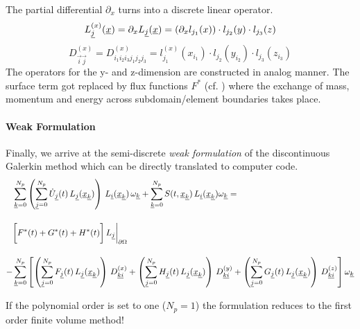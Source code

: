 The partial differential
$\partial_x$ turns into a discrete linear operator.
\newcommand{\DXKI}{D^{(x)}_{\vec{k}\vec{i}}}
\newcommand{\DYKI}{D^{(y)}_{\vec{k}\vec{i}}}
\newcommand{\DZKI}{D^{(z)}_{\vec{k}\vec{i}}}
\begin{equation}
    L^{(x)}_{\underline{j}}(\underline{x}) = \partial_x L_{\underline{j}}(\underline{x}) = (\partial_x l_{j_1}(x)) \cdot l_{j_2}(y) \cdot l_{j_3}(z)
\end{equation}
\begin{equation}
    D^{(x)}_{\vec{i}\vec{j}} = D^{(x)}_{i_1i_2i_3j_1j_2j_3} = l^{(x)}_{j_1}(x_{i_1})\cdot l_{j_2}(y_{i_2}) \cdot l_{j_3}(z_{i_3})
\end{equation}
The operators for the y- and z-dimension are constructed in analog manner.  The
surface term got replaced by flux functions $F^*$ (cf. )
where the exchange of mass, momentum and energy across subdomain/element
boundaries takes place.

\paragraph{Weak Formulation}
Finally, we arrive at the semi-discrete \emph{weak formulation} of the
discontinuous Galerkin method which can be directly translated to computer
code.
\begin{align}
\label{eqn:semi-discrete-weak-formulation}
     &\sumK \left(\sumJ \UJ \, \LJK \right) \, \LIK \,\wK + \sumK \STXK \, \LIK \wK = \nonumber \br
     &\bigg[ F^*(t) + G^*(t) + H^*(t)\bigg]\, L_{\vec{j}}\bigg|_{\partial\Omega} \br
    -&\sumK \left[
          \left(\sumJ \FJ \, \LJK \right) \, \DXKI 
        + \left(\sumJ \HJ \, \LJK \right) \, \DYKI
        + \left(\sumJ \GJ \, \LJK \right) \, \DZKI \right] \wK \nonumber
\end{align}

\remark If the polynomial order is set to one ($N_p = 1$) the formulation reduces
to the first order finite volume method!
